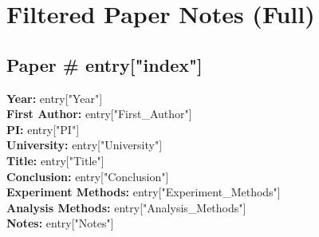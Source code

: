 \documentclass[11pt]{article}
\begin{document}
\section*{Filtered Paper Notes (Full)}


\subsection*{Paper \#{{ entry["index"] }}}
\textbf{Year:} {{ entry["Year"] }} \\
\textbf{First Author:} {{ entry["First_Author"] }} \\
\textbf{PI:} {{ entry["PI"] }} \\
\textbf{University:} {{ entry["University"] }} \\
\textbf{Title:} {{ entry["Title"] }} \\
\textbf{Conclusion:} {{ entry["Conclusion"] }} \\
\textbf{Experiment Methods:} {{ entry["Experiment_Methods"] }} \\
\textbf{Analysis Methods:} {{ entry["Analysis_Methods"] }} \\
\textbf{Notes:} {{ entry["Notes"] }} \\

\end{document}
